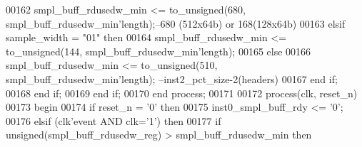 \begin{DoxyCode}
00162                 \textcolor{vhdlchar}{smpl_buff_rdusedw_min} \textcolor{vhdlchar}{<=} \textcolor{vhdlchar}{to\_unsigned}\textcolor{vhdlchar}{(}\textcolor{vhdllogic}{}\textcolor{vhdllogic}{680}\textcolor{vhdlchar}{,} \textcolor{vhdlchar}{smpl_buff_rdusedw_min}\textcolor{vhdlchar}{'}\textcolor{vhdlkeyword}{length}\textcolor{vhdlchar}{)};\textcolor{keyword}{--680 (512x64b) or
       168(128x64b)}
00163             \textcolor{keywordflow}{elsif} \textcolor{vhdlchar}{sample_width} \textcolor{vhdlchar}{=} \textcolor{vhdllogic}{"01"} \textcolor{keywordflow}{then}
00164                 \textcolor{vhdlchar}{smpl_buff_rdusedw_min} \textcolor{vhdlchar}{<=} \textcolor{vhdlchar}{to\_unsigned}\textcolor{vhdlchar}{(}\textcolor{vhdllogic}{}\textcolor{vhdllogic}{144}\textcolor{vhdlchar}{,} \textcolor{vhdlchar}{smpl_buff_rdusedw_min}\textcolor{vhdlchar}{'}\textcolor{vhdlkeyword}{length}\textcolor{vhdlchar}{)};
00165             \textcolor{keywordflow}{else}
00166                 \textcolor{vhdlchar}{smpl_buff_rdusedw_min} \textcolor{vhdlchar}{<=} \textcolor{vhdlchar}{to\_unsigned}\textcolor{vhdlchar}{(}\textcolor{vhdllogic}{}\textcolor{vhdllogic}{510}\textcolor{vhdlchar}{,} \textcolor{vhdlchar}{smpl_buff_rdusedw_min}\textcolor{vhdlchar}{'}\textcolor{vhdlkeyword}{length}\textcolor{vhdlchar}{)};\textcolor{keyword}{
      --inst2\_pct\_size-2(headers)}
00167             \textcolor{keywordflow}{end} \textcolor{keywordflow}{if};
00168         \textcolor{keywordflow}{end} \textcolor{keywordflow}{if};
00169    \textcolor{keywordflow}{end} \textcolor{keywordflow}{if};
00170 \textcolor{keywordflow}{end} \textcolor{keywordflow}{process};
00171 
00172 \textcolor{keywordflow}{process}(clk, reset_n)
00173 \textcolor{vhdlkeyword}{begin}
00174    \textcolor{keywordflow}{if} \textcolor{vhdlchar}{reset_n} \textcolor{vhdlchar}{=} \textcolor{vhdlchar}{'}\textcolor{vhdllogic}{}\textcolor{vhdllogic}{0}\textcolor{vhdlchar}{'} \textcolor{keywordflow}{then} 
00175       inst0\_smpl\_buff\_rdy <= '0';
00176    \textcolor{keywordflow}{elsif} \textcolor{vhdlchar}{(}\textcolor{vhdlchar}{clk}\textcolor{vhdlchar}{'}\textcolor{vhdlkeyword}{event} \textcolor{keywordflow}{AND} \textcolor{vhdlchar}{clk}\textcolor{vhdlchar}{=}\textcolor{vhdlchar}{'}\textcolor{vhdllogic}{}\textcolor{vhdllogic}{1}\textcolor{vhdlchar}{'}\textcolor{vhdlchar}{)} \textcolor{keywordflow}{then}
00177       \textcolor{keywordflow}{if} \textcolor{comment}{unsigned}\textcolor{vhdlchar}{(}\textcolor{vhdlchar}{smpl_buff_rdusedw_reg}\textcolor{vhdlchar}{)} \textcolor{vhdlchar}{>} \textcolor{vhdlchar}{smpl_buff_rdusedw_min} \textcolor{keywordflow}{then} 

\end{DoxyCode}
